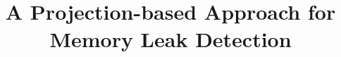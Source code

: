 \documentclass[conference]{IEEEtran}
\begin{document}
\title{A Projection-based Approach for Memory Leak Detection}

\end{document}
